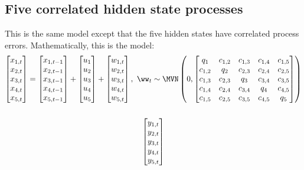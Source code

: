 \subsection{Five correlated hidden state processes}
This is the same model except that the five hidden states have correlated process errors.  Mathematically, this is the model:
\begin{gather*}
\begin{bmatrix}x_{1,t}\\x_{2,t}\\x_{3,t}\\x_{4,t}\\x_{5,t}\end{bmatrix}
= \begin{bmatrix}x_{1,t-1}\\x_{2,t-1}\\x_{3,t-1}\\x_{4,t-1}\\x_{5,t-1}\end{bmatrix}
+ \begin{bmatrix}u_1\\u_2\\u_3\\u_4\\u_5\end{bmatrix}
+ \begin{bmatrix}w_{1,t}\\w_{2,t}\\w_{3,t}\\w_{4,t}\\w_{5,t}\end{bmatrix}, 
 \textrm{ } \ww_t \sim \MVN\begin{pmatrix}0,
 \begin{bmatrix}q_1&c_{1,2}&c_{1,3}&c_{1,4}&c_{1,5}\\c_{1,2}&q_2&c_{2,3}&c_{2,4}&c_{2,5}\\
 c_{1,3}&c_{2,3}&q_3&c_{3,4}&c_{3,5}\\c_{1,4}&c_{2,4}&c_{3,4}&q_4&c_{4,5}\\
 c_{1,5}&c_{2,5}&c_{3,5}&c_{4,5}&q_5\end{bmatrix} \end{pmatrix} \\
\\
\begin{bmatrix}y_{1,t}\\y_{2,t}\\y_{3,t}\\y_{4,t}\\y_{5,t}\end{bmatrix}

\end{gather*}
